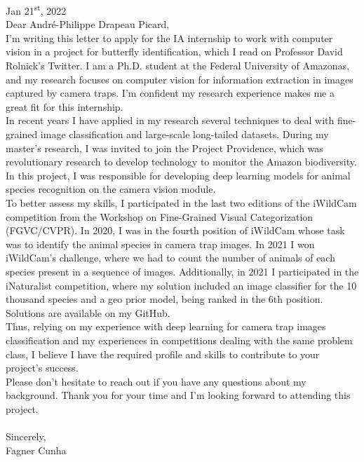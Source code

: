 \documentclass[10pt]{developercv}
\begin{document}
\begin{minipage}[t]{\textwidth}
\large
Jan 21\textsuperscript{st}, 2022\\

Dear André-Philippe Drapeau Picard,\\

I'm writing this letter to apply for the IA internship to work with computer 
vision in a project for butterfly identification, which I read on Professor 
David Rolnick's Twitter. I am a Ph.D. student at the Federal University of 
Amazonas, and my research focuses on computer vision for information extraction 
in images captured by camera traps. I'm confident my research experience makes 
me a great fit for this internship.\\

In recent years I have applied in my research several techniques to deal with 
fine-grained image classification and large-scale long-tailed datasets. During 
my master's research, I was invited to join the Project Providence, which was
revolutionary research to develop technology to monitor the Amazon biodiversity. 
In this project, I was responsible for developing deep learning models for 
animal species recognition on the camera vision module.\\

To better assess my skills, I participated in the last two editions of the 
iWildCam competition from the Workshop on Fine-Grained Visual Categorization 
(FGVC/CVPR). In 2020, I was in the fourth position of iWildCam whose 
task was to identify the animal species in camera trap images. In 2021 I won 
iWildCam's challenge, where we had to count the number of animals of each 
species present in a sequence of images. Additionally, in 2021 I participated in 
the iNaturalist competition, where my solution included an image classifier for 
the 10 thousand species and a geo prior model, being ranked in the 6th 
position. Solutions are available on my GitHub.\\

Thus, relying on my experience with deep learning for camera trap images 
classification and my experiences in competitions dealing with the same problem 
class, I believe I have the required profile and skills to contribute to your 
project's success.\\

Please don’t hesitate to reach out if you have any questions about my 
background. Thank you for your time and I’m looking forward to attending this 
project.\\\\

Sincerely,\\

Fagner Cunha

\end{minipage}
\end{document}
